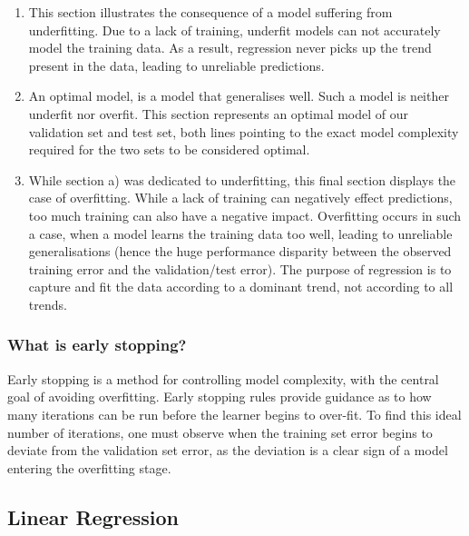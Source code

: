 \documentclass[12pt,a4paper]{article}
\begin{document}
\begin{enumerate}[label=\alph*)]
\itemsep-0.25em 
	\item This section illustrates the consequence of a model suffering from underfitting. Due to a lack of training, underfit models can not accurately model the training data. As a result, regression never picks up the trend present in the data, leading to unreliable predictions.
	\item An optimal model, is a model that generalises well. Such a model is neither underfit nor overfit. This section represents an optimal model of our validation set and test set, both lines pointing to the exact model complexity required for the two sets to be considered optimal.
	\item While section a) was dedicated to underfitting, this final section displays the case of overfitting. While a lack of training can negatively effect predictions, too much training can also have a negative impact. Overfitting occurs in such a case, when a model learns the training data too well, leading to unreliable generalisations (hence the huge performance disparity between the observed training error and the validation/test error). The purpose of regression is to capture and fit the data according to a dominant trend, not according to all trends.
\end{enumerate}

\subsubsection*{What is early stopping?}

Early stopping is a method for controlling model complexity, with the central goal of avoiding overfitting. Early stopping rules provide guidance as to how many iterations can be run before the learner begins to over-fit. To find this ideal number of iterations, one must observe when the training set error begins to deviate from the validation set error, as the deviation is a clear sign of a model entering the overfitting stage.

\newpage
\subsection*{Linear Regression}

\subsubsection{}
\end{document}
